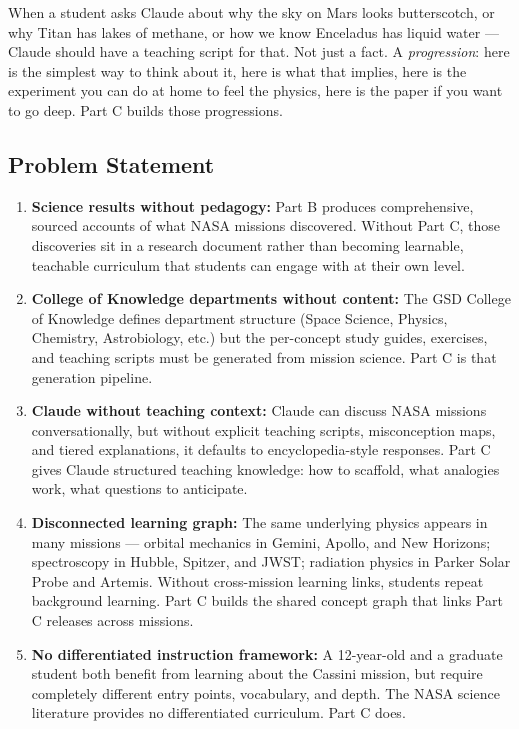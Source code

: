 \documentclass[11pt,letterpaper]{article}
\begin{document}
When a student asks Claude about why the sky on Mars looks butterscotch, or why Titan has lakes of methane, or how we know Enceladus has liquid water --- Claude should have a teaching script for that. Not just a fact. A \textit{progression}: here is the simplest way to think about it, here is what that implies, here is the experiment you can do at home to feel the physics, here is the paper if you want to go deep. Part C builds those progressions.

\subsection{Problem Statement}

\begin{enumerate}[leftmargin=*, label=\textbf{P\arabic*.}]
  \item \textbf{Science results without pedagogy:} Part B produces comprehensive, sourced accounts of what NASA missions discovered. Without Part C, those discoveries sit in a research document rather than becoming learnable, teachable curriculum that students can engage with at their own level.
  \item \textbf{College of Knowledge departments without content:} The GSD College of Knowledge defines department structure (Space Science, Physics, Chemistry, Astrobiology, etc.) but the per-concept study guides, exercises, and teaching scripts must be generated from mission science. Part C is that generation pipeline.
  \item \textbf{Claude without teaching context:} Claude can discuss NASA missions conversationally, but without explicit teaching scripts, misconception maps, and tiered explanations, it defaults to encyclopedia-style responses. Part C gives Claude structured teaching knowledge: how to scaffold, what analogies work, what questions to anticipate.
  \item \textbf{Disconnected learning graph:} The same underlying physics appears in many missions --- orbital mechanics in Gemini, Apollo, and New Horizons; spectroscopy in Hubble, Spitzer, and JWST; radiation physics in Parker Solar Probe and Artemis. Without cross-mission learning links, students repeat background learning. Part C builds the shared concept graph that links Part C releases across missions.
  \item \textbf{No differentiated instruction framework:} A 12-year-old and a graduate student both benefit from learning about the Cassini mission, but require completely different entry points, vocabulary, and depth. The NASA science literature provides no differentiated curriculum. Part C does.
\end{enumerate}
\end{document}
